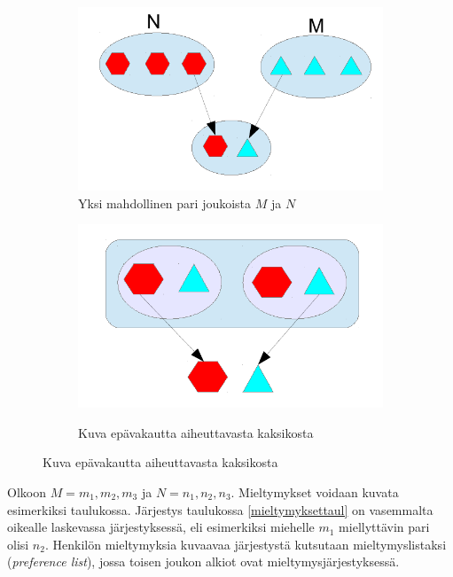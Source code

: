 \documentclass[finnish]{tktltiki2}
\theoremstyle{definition}
\theoremstyle{remark}
\begin{document}
\begin{figure}[t]
	\begin{subfigure}{.6\textwidth}
	\includegraphics[scale=0.6]{paritutk}
	\caption{Yksi mahdollinen pari joukoista $M$ ja $N$}
	\end{subfigure}
	\begin{subfigure}{.3\textwidth}
	\includegraphics[scale=0.6]{vakaatutk}\label{epävakaa}
	\caption{Kuva epävakautta aiheuttavasta kaksikosta}
	\end{subfigure}
\end{figure}


Olkoon $M = {m_1, m_2, m_3}$ ja $N = {n_1, n_2, n_3}$. Mieltymykset voidaan kuvata esimerkiksi taulukossa. Järjestys taulukossa \ref{mieltymyksettaul} on vasemmalta oikealle laskevassa järjestyksessä, eli esimerkiksi miehelle $m_1$ miellyttävin pari olisi $n_2$. Henkilön mieltymyksia kuvaavaa järjestystä kutsutaan mieltymyslistaksi (\emph{preference list}), jossa toisen joukon alkiot ovat mieltymysjärjestyksessä.
\end{document}
